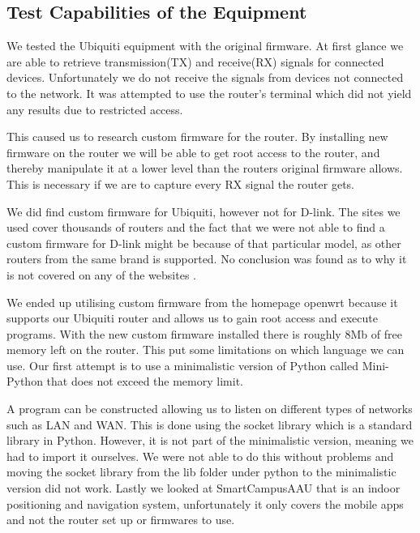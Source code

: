 \subsection*{Test Capabilities of the Equipment}
We tested the Ubiquiti equipment with the original firmware. At first glance we are able to retrieve transmission(TX) and receive(RX) signals for connected devices. Unfortunately we do not receive the signals from devices not connected to the network. It was attempted to use the router's terminal which did not yield any results due to restricted access.

This caused us to research custom firmware for the router. By installing new firmware on the router we will be able to get root access to the router, and thereby manipulate it at a lower level than the routers original firmware allows. This is necessary if we are to capture every RX signal the router gets.

We did find custom firmware for Ubiquiti, however not for D-link. The sites we used cover thousands of routers and the fact that we were not able to find a custom firmware for D-link might be because of that particular model, as other routers from the same brand is supported. No conclusion was found as to why it is not covered on any of the websites \cite{firmware_1}\cite{firmware_2}\cite{firmware_3}\cite{firmware_4}\cite{firmware_5}\cite{firmware_6}.

We ended up utilising custom firmware from the homepage openwrt because it supports our Ubiquiti router and allows us to gain root access and execute programs. With the new custom firmware installed there is roughly 8Mb of free memory left on the router. This put some limitations on which language we can use. Our first attempt is to use a minimalistic version of Python called Mini-Python that does not exceed the memory limit.

A program can be constructed allowing us to listen on different types of networks such as LAN and WAN. This is done using the socket library which is a standard library in Python. However, it is not part of the minimalistic version, meaning we had to import it ourselves. We were not able to do this without problems and moving the socket library from the lib folder under python to the minimalistic version did not work. Lastly we looked at SmartCampusAAU that is an indoor positioning and navigation system, unfortunately it only covers the mobile apps and not the router set up or firmwares to use.

